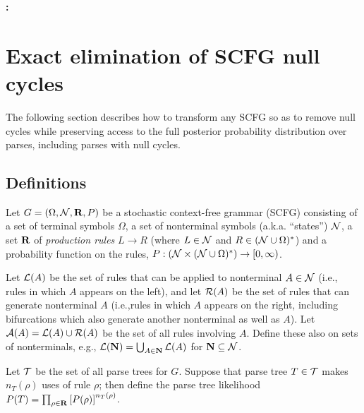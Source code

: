 \documentclass[10pt]{article}
\date{}
\begin{document}
\begin{flushleft}
  {\Large
    \textbf{\titlestring: \supptext}
  }
\\
\authorstring
\end{flushleft}


\newpage
\tableofcontents

\newpage
\section{Exact elimination of SCFG null cycles}

The following section describes how to transform any SCFG so as to remove null cycles while preserving access to the full posterior probability distribution over parses, including parses with null cycles.

\subsection{Definitions}

Let $G = ( \Omega, {\cal N}, {\bf R}, P )$ be a stochastic context-free grammar (SCFG)
consisting of
a set of terminal symbols $\Omega$,
a set of nonterminal symbols (a.k.a. ``states'') ${\cal N}$,
a set ${\bf R}$ of {\em production rules} $L \to R$ (where $L \in {\cal N}$ and $R \in ( {\cal N} \cup \Omega )^\ast$)
and a probability function on the rules, $P:({\cal N} \times ( {\cal N} \cup \Omega )^\ast) \to [0,\infty)$.


Let ${\cal L}(A)$ be the set of rules that can be applied to nonterminal $A \in {\cal N}$ (i.e., rules in which $A$ appears on the left),
and let ${\cal R}(A)$ be the set of rules that can generate nonterminal $A$ (i.e.,rules in which $A$ appears on the right, including bifurcations which also generate another nonterminal as well as $A$).
Let ${\cal A}(A) = {\cal L}(A) \cup {\cal R}(A)$ be the set of all rules involving $A$.
Define these also on sets of nonterminals, e.g., ${\cal L}({\bf N}) = \bigcup_{A \in {\bf N}} {\cal L}(A)$ for ${\bf N} \subseteq {\cal N}$.

Let ${\cal T}$ be the set of all parse trees for $G$.
Suppose that parse tree $T \in {\cal T}$ makes $n_T(\rho)$ uses of rule $\rho$;
then define the parse tree likelihood $P(T) = \prod_{\rho \in {\bf R}} \left[ P(\rho) \right]^{n_T(\rho)}$.
\end{document}
